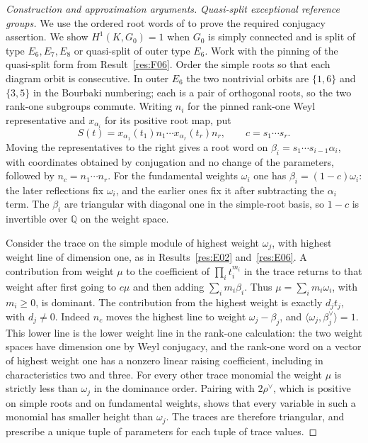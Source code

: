 \documentclass[11pt,a4paper,openany,oneside]{book}
\theoremstyle{resultstyle}
\theoremstyle{definition}
\numberwithin{equation}{chapter}
\begin{document}
\begin{proof}[Construction and approximation arguments]
\medskip\noindent
\textit{Quasi-split exceptional reference groups.}
We use the ordered root words of \cite[Section 7]{steinbergregular}
to prove the required conjugacy assertion.
We show \(H^1(K,G_0)=1\) when \(G_0\) is simply connected
and is split of type \(E_6,E_7,E_8\) or quasi-split of
outer type \(E_6\). Work with the pinning of the quasi-split
form from Result~\ref{res:F06}. Order the simple roots so
that each diagram orbit is consecutive. In outer \(E_6\)
the two nontrivial orbits are \(\{1,6\}\) and \(\{3,5\}\)
in the Bourbaki numbering; each is a pair of orthogonal
roots, so the two rank-one subgroups commute.
Writing \(n_i\) for the pinned rank-one Weyl representative
and \(x_{\alpha_i}\) for its positive root map, put
\[
 S(t)=x_{\alpha_1}(t_1)n_1\cdots x_{\alpha_r}(t_r)n_r,\qquad
 c=s_1\cdots s_r.
\]
Moving the representatives to the right gives a root word
on \(\beta_i=s_1\cdots s_{i-1}\alpha_i\), with coordinates
obtained by conjugation and no change of the parameters,
followed by \(n_c=n_1\cdots n_r\). For the fundamental
weights \(\omega_i\) one has \(\beta_i=(1-c)\omega_i\):
the later reflections fix \(\omega_i\), and the earlier
ones fix it after subtracting the \(\alpha_i\) term.
The \(\beta_i\) are triangular with diagonal one in the
simple-root basis, so \(1-c\) is invertible over
\(\mathbb Q\) on the weight space.

Consider the trace on the simple module of highest
weight \(\omega_j\), with highest weight line of
dimension one, as in Results~\ref{res:E02} and~\ref{res:E06}.
A contribution from weight \(\mu\) to the coefficient of
\(\prod_i t_i^{m_i}\) in the trace returns to that weight
after first going to \(c\mu\) and then adding
\(\sum_i m_i\beta_i\). Thus \(\mu=\sum_i m_i\omega_i\),
with \(m_i\geq0\), is dominant. The contribution from the
highest weight is exactly \(d_j t_j\), with \(d_j\ne0\).
Indeed \(n_c\) moves the highest line to weight
\(\omega_j-\beta_j\), and
\(\langle\omega_j,\beta_j^\vee\rangle=1\).
This lower line is the lower weight line in the
rank-one calculation: the two weight spaces have
dimension one by Weyl conjugacy, and the rank-one word
on a vector of highest weight one has a nonzero
linear raising coefficient, including in characteristics
two and three. For every other trace monomial the weight
\(\mu\) is strictly less than \(\omega_j\) in the dominance
order. Pairing with \(2\rho^\vee\), which is positive on
simple roots and on fundamental weights, shows that every
variable in such a monomial has smaller height than
\(\omega_j\). The traces are therefore triangular,
and prescribe a unique tuple of parameters for each
tuple of trace values.


\end{proof}
\end{document}
